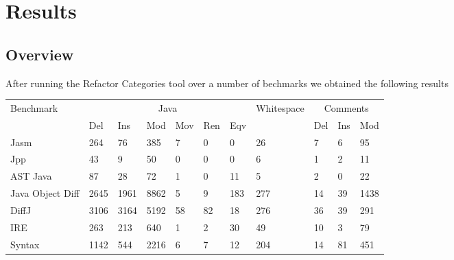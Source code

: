 

\section{Results}
\subsection{Overview}
After running the Refactor Categories tool over a number of bechmarks we obtained the following results 

\begin{table}[H]
    \begin{tabular}{l|llllll|l|lll}
    Benchmark        & \multicolumn{6}{|c|}{Java}           & Whitespace & \multicolumn{3}{|c}{Comments} \\ \cline{2-7} \cline{9-11}
    ~                & Del  & Ins  & Mod  & Mov & Ren & Eqv & ~          & Del      & Ins & Mod  \\ \hline
    Jasm             & 264  & 76   & 385  & 7   & 0   & 0   & 26         & 7        & 6   & 95   \\
    Jpp              & 43   & 9    & 50   & 0   & 0   & 0   & 6          & 1        & 2   & 11   \\
    AST Java         & 87   & 28   & 72   & 1   & 0   & 11  & 5          & 2        & 0   & 22   \\
    Java Object Diff & 2645 & 1961 & 8862 & 5   & 9   & 183 & 277        & 14       & 39  & 1438 \\
    DiffJ            & 3106 & 3164 & 5192 & 58  & 82  & 18  & 276        & 36       & 39  & 291  \\
    IRE              & 263  & 213  & 640  & 1   & 2   & 30  & 49         & 10       & 3   & 79   \\
    Syntax           & 1142 & 544  & 2216 & 6   & 7   & 12  & 204        & 14       & 81  & 451  \\
    \end{tabular}
\end{table}







